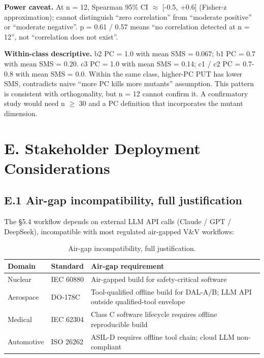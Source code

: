 \documentclass[manuscript,screen,review]{acmart}
\begin{document}
\textbf{Power caveat.} At n = 12, Spearman 95\% CI $\approx$ {[}-0.5, +0.6{]}
(Fisher-z approximation); cannot distinguish ``zero correlation'' from ``moderate positive'' or
``moderate negative''. p = 0.61 / 0.57 means ``no correlation detected
at n = 12'', not ``correlation does not exist''.

\textbf{Within-class descriptive.} b2 PC = 1.0 with mean SMS = 0.067; b1
PC = 0.7 with mean SMS = 0.20. c3 PC = 1.0 with mean SMS = 0.14; c1 / c2
PC = 0.7-0.8 with mean SMS = 0.0. Within the same class, higher-PC PUT
has lower SMS, contradicts naive ``more PC kills more mutants''
assumption. This pattern is consistent with orthogonality, but n = 12
cannot confirm it. A confirmatory study would need n $\geq$ 30 and a PC
definition that incorporates the mutant dimension.


\section{E. Stakeholder Deployment Considerations}\label{e.-stakeholder-deployment-considerations-single-output-kernels-scope}

\subsection{E.1 Air-gap incompatibility, full justification}\label{e.1-air-gap-incompatibility-full-justification}

The §5.4 workflow depends on external LLM API calls (Claude / GPT /
DeepSeek), incompatible with most regulated air-gapped V\&V workflows:

{%
\begin{longtable}[]{@{}
  >{\raggedright\arraybackslash}p{}
  >{\raggedright\arraybackslash}p{}
  >{\raggedright\arraybackslash}p{}@{}}
\caption{Air-gap incompatibility, full justification.}\label{tab:p2-25}\\
\toprule\noalign{}
\begin{minipage}[b]{\linewidth}\raggedright
Domain
\end{minipage} & \begin{minipage}[b]{\linewidth}\raggedright
Standard
\end{minipage} & \begin{minipage}[b]{\linewidth}\raggedright
Air-gap requirement
\end{minipage} \\
\midrule\noalign{}
\endfirsthead
\endhead
\bottomrule\noalign{}
\endlastfoot
Nuclear & IEC 60880 & Air-gapped build for safety-critical software \\
Aerospace & DO-178C & Tool-qualified offline build for DAL-A/B; LLM API
outside qualified-tool envelope \\
Medical & IEC 62304 & Class C software lifecycle requires offline
reproducible build \\
Automotive & ISO 26262 & ASIL-D requires offline tool chain; cloud LLM
non-compliant \\
\end{longtable}
}
\end{document}
